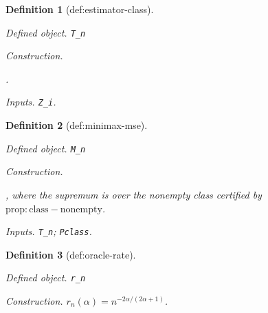 \documentclass{article}
\newtheorem{definition}{Definition}
\begin{document}
\begin{definition}[def:estimator-class]\label{def:estimator-class}
\par\smallskip\noindent\emph{Defined object.} \texttt{T\_\allowbreak{}n}
\par\smallskip\noindent\emph{Construction.} \par\noindent {}\par\noindent.
\par\smallskip\noindent\emph{Inputs.} \texttt{Z\_\allowbreak{}i}.
\end{definition}

\begin{definition}[def:minimax-mse]\label{def:minimax-mse}
\par\smallskip\noindent\emph{Defined object.} \texttt{M\_\allowbreak{}n}
\par\smallskip\noindent\emph{Construction.} \par\noindent {}\par\noindent, where the supremum is over the nonempty class certified by \(\mathrm{prop:class-nonempty}\).
\par\smallskip\noindent\emph{Inputs.} \texttt{T\_\allowbreak{}n}; \texttt{Pclass}.
\end{definition}

\begin{definition}[def:oracle-rate]\label{def:oracle-rate}
\par\smallskip\noindent\emph{Defined object.} \texttt{r\_\allowbreak{}n}
\par\smallskip\noindent\emph{Construction.} \(r_n(\alpha)=n^{-2\alpha/(2\alpha+1)}\).
\end{definition}
\end{document}
